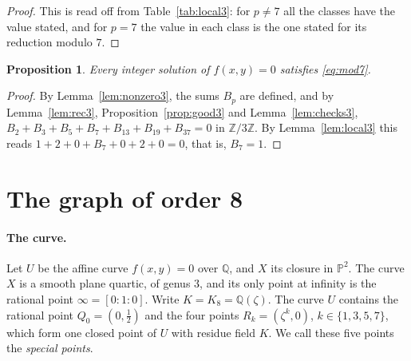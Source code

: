 \documentclass[11pt]{article}
\newtheorem{proposition}[theorem]{Proposition}
\newcommand{\Z}{\mathbb{Z}}
\newcommand{\Q}{\mathbb{Q}}
\begin{document}
\begin{proof}
This is read off from Table~\ref{tab:local3}: for $p\neq7$ all the classes have the value stated, and for $p=7$ the value in each class is the one stated for its reduction modulo $7$.
\end{proof}

\begin{proposition}\label{prop:mod7}
Every integer solution of $f(x,y)=0$ satisfies \eqref{eq:mod7}.
\end{proposition}

\begin{proof}
By Lemma~\ref{lem:nonzero3}, the sums $B_p$ are defined, and by Lemma~\ref{lem:rec3}, Proposition~\ref{prop:good3} and Lemma~\ref{lem:checks3}, $B_2+B_3+B_5+B_7+B_{13}+B_{19}+B_{37}=0$ in $\Z/3\Z$. By Lemma~\ref{lem:local3} this reads $1+2+0+B_7+0+2+0=0$, that is, $B_7=1$.
\end{proof}

\section{The graph of order 8}\label{sec:octic}

\paragraph{The curve.} Let $U$ be the affine curve $f(x,y)=0$ over $\Q$, and $X$ its closure in $\mathbb P^2$. The curve $X$ is a smooth plane quartic, of genus $3$, and its only point at infinity is the rational point $\infty=[0:1:0]$. Write $K=K_8=\Q(\zeta)$. The curve $U$ contains the rational point $Q_0=(0,\tfrac12)$ and the four points $R_k=(\zeta^k,0)$, $k\in\{1,3,5,7\}$, which form one closed point of $U$ with residue field $K$. We call these five points the \emph{special points}.
\end{document}
